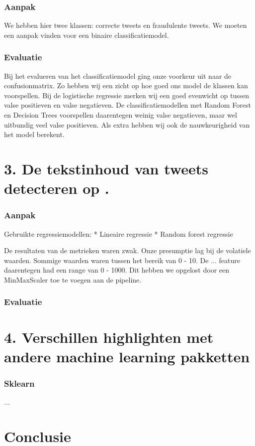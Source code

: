 \documentclass[a4paper,12pt,twoside]{report}
\begin{document}
\subsection*{Aanpak}
We hebben hier twee klassen: correcte tweets en fraudulente tweets. We moeten een aanpak vinden voor een binaire classificatiemodel.

\subsection*{Evaluatie}
Bij het evalueren van het classificatiemodel ging onze voorkeur uit naar de confusionmatrix. Zo hebben wij een zicht op hoe goed ons model de klassen kan voorspellen. Bij de logistische regressie merken wij een goed evenwicht op tussen valse positieven en valse negatieven. De classificatiemodellen met Random Forest en Decision Trees voorspellen daarentegen weinig valse negatieven, maar wel uitbundig veel valse positieven. Als extra hebben wij ook de nauwkeurigheid van het model berekent.

\chapter*{3. De tekstinhoud van tweets detecteren op .}

\subsection*{Aanpak}

Gebruikte regressiemodellen:
* Lineaire regressie
* Random forest regressie

De resultaten van de metrieken waren zwak. Onze presumptie lag bij de volatiele waarden. Sommige waarden waren tussen het bereik van 0 - 10. De ... feature daarentegen had een range van 0 - 1000. Dit hebben we opgelost door een MinMaxScaler toe te voegen aan de pipeline.

\subsection*{Evaluatie}

\chapter*{4. Verschillen highlighten met andere machine learning pakketten}

\subsection*{Sklearn}

...

\chapter*{Conclusie}



\appendix
\end{document}
